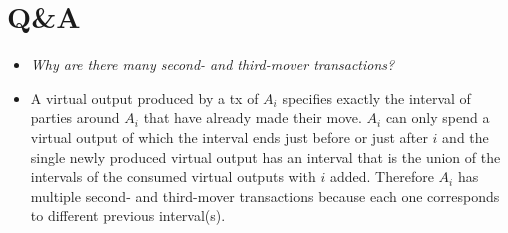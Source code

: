 \section*{Q\&A}
\begin{itemize}
  \item \emph{Why are there many second- and third-mover transactions?}
  \item A virtual output produced by a tx of $A_i$ specifies exactly the
  interval of parties around $A_i$ that have already made their move. $A_i$ can
  only spend a virtual output of which the interval ends just before or just
  after $i$ and the single newly produced virtual output has an interval that is
  the union of the intervals of the consumed virtual outputs with $i$ added.
  Therefore $A_i$ has multiple second- and third-mover transactions because each
  one corresponds to different previous interval(s).


\end{itemize}
